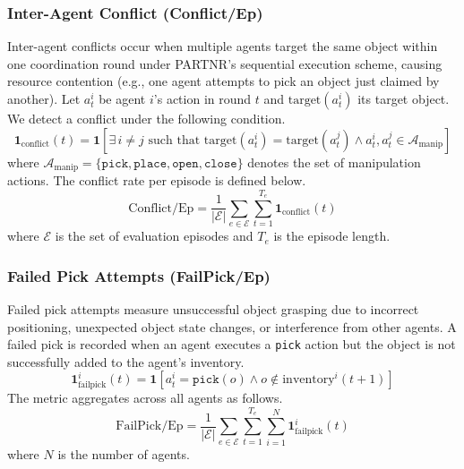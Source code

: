 \documentclass{article}
\theoremstyle{plain}
\theoremstyle{definition}
\theoremstyle{remark}
\begin{document}
\subsubsection{Inter-Agent Conflict (Conflict/Ep)}

Inter-agent conflicts occur when multiple agents target the same object within one coordination round under PARTNR's sequential execution scheme, causing resource contention (e.g., one agent attempts to pick an object just claimed by another). Let $a_t^i$ be agent $i$'s action in round $t$ and $\text{target}(a_t^i)$ its target object. We detect a conflict under the following condition.
\begin{equation}
    \mathbf{1}_{\text{conflict}}(t) = \mathbf{1}\left[ \exists\, i \neq j \text{ such that } \text{target}(a_t^i) = \text{target}(a_t^j) \land a_t^i, a_t^j \in \mathcal{A}_{\text{manip}} \right]
\end{equation}
where $\mathcal{A}_{\text{manip}} = \{\texttt{pick}, \texttt{place}, \texttt{open}, \texttt{close}\}$ denotes the set of manipulation actions. The conflict rate per episode is defined below.
\begin{equation}
    \text{Conflict/Ep} = \frac{1}{|\mathcal{E}|} \sum_{e \in \mathcal{E}} \sum_{t=1}^{T_e} \mathbf{1}_{\text{conflict}}(t)
\end{equation}
where $\mathcal{E}$ is the set of evaluation episodes and $T_e$ is the episode length.

\subsubsection{Failed Pick Attempts (FailPick/Ep)}

Failed pick attempts measure unsuccessful object grasping due to incorrect positioning, unexpected object state changes, or interference from other agents. A failed pick is recorded when an agent executes a \texttt{pick} action but the object is not successfully added to the agent's inventory.
\begin{equation}
    \mathbf{1}_{\text{failpick}}^i(t) = \mathbf{1}\left[ a_t^i = \texttt{pick}(o) \land o \notin \text{inventory}^i(t+1) \right]
\end{equation}
The metric aggregates across all agents as follows.
\begin{equation}
    \text{FailPick/Ep} = \frac{1}{|\mathcal{E}|} \sum_{e \in \mathcal{E}} \sum_{t=1}^{T_e} \sum_{i=1}^{N} \mathbf{1}_{\text{failpick}}^i(t)
\end{equation}
where $N$ is the number of agents.
\end{document}
